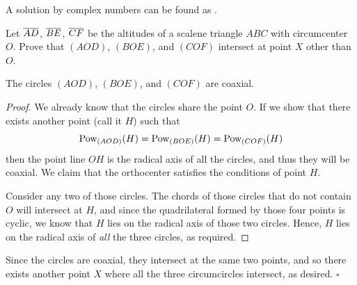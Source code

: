 \documentclass{article}
\begin{document}
\begin{remark*}
A solution by complex numbers can be found as .
\end{remark*}

\begin{problem}[2.36]{}
Let $\overline{AD}$, $\overline{BE}$, $\overline{CF}$ be the altitudes of a scalene triangle $ABC$ with circumcenter $O$. Prove that $(AOD)$, $(BOE)$, and $(COF)$ intersect at point $X$ other than $O$.
\end{problem}
\begin{claim*}
The circles $(AOD)$, $(BOE)$, and $(COF)$ are coaxial.
\end{claim*}
\begin{proof}
We already know that the circles share the point $O$. If we show that there exists another point (call it $H$) such that \[\text{Pow}_{(AOD)}(H)=\text{Pow}_{(BOE)}(H)=\text{Pow}_{(COF)}(H)\] then the point line $OH$ is the radical axis of all the circles, and thus they will be coaxial. We claim that the orthocenter satisfies the conditions of point $H$.

Consider any two of those circles. The chords of those circles that do not contain $O$ will intersect at $H$, and since the quadrilateral formed by those four points is cyclic, we know that $H$ lies on the radical axis of those two circles. Hence, $H$ lies on the radical axis of \emph{all} the three circles, as required.
\end{proof}

Since the circles are coaxial, they intersect at the same two points, and so there exists another point $X$ where all the three circumcircles intersect, as desired. $\square$

\newpage
\end{document}
